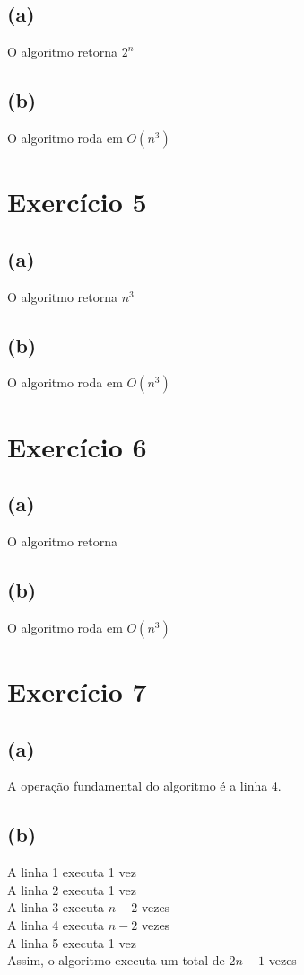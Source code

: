 \documentclass{article}
\begin{document}
\subsection*{(a)}
O algoritmo retorna $2^n$
\subsection*{(b)}
O algoritmo roda em $O(n^3)$

\section{Exercício 5}
\subsection*{(a)}
O algoritmo retorna $n^3$
\subsection*{(b)}
O algoritmo roda em $O(n^3)$

\section{Exercício 6}
\subsection*{(a)}
O algoritmo retorna
\subsection*{(b)}
O algoritmo roda em $O(n^3)$

\section{Exercício 7}
\subsection*{(a)}
A operação fundamental do algoritmo é a linha 4.
\subsection*{(b)}
A linha 1 executa 1 vez\\
A linha 2 executa 1 vez\\
A linha 3 executa $n - 2$ vezes\\
A linha 4 executa $n - 2$ vezes\\
A linha 5 executa 1 vez\\
Assim, o algoritmo executa um total de $2n-1$ vezes
\end{document}
